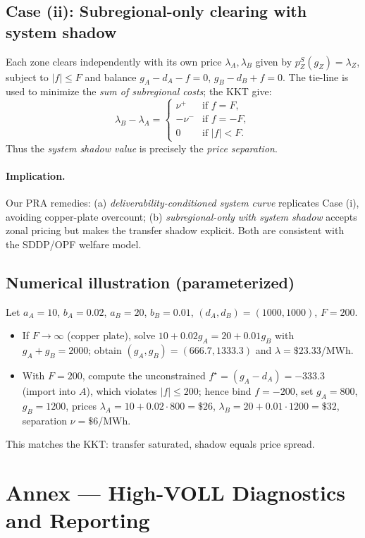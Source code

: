 \documentclass[11pt]{article}
\numberwithin{equation}{section}
\theoremstyle{definition}
\theoremstyle{remark}
\begin{document}
\subsection{ Case (ii): Subregional-only clearing with system shadow}
Each zone clears independently with its own price $\lambda_A,\lambda_B$ given by $p^S_Z(g_Z)=\lambda_Z$, subject to $|f|\le F$ and balance $g_A-d_A-f=0$, $g_B-d_B+f=0$. The tie-line is used to minimize the \emph{sum of subregional costs}; the KKT give:
\[
\lambda_B - \lambda_A = 
\begin{cases}
\nu^{+} & \text{if } f=F,\\
-\nu^{-} & \text{if } f=-F,\\
0 & \text{if } |f|<F.
\end{cases}
\]
Thus the \emph{system shadow value} is precisely the \emph{price separation}. 

\paragraph{Implication.}
Our PRA remedies: (a) \emph{deliverability-conditioned system curve} replicates Case (i), avoiding copper-plate overcount; (b) \emph{subregional-only with system shadow} accepts zonal pricing but makes the transfer shadow explicit. Both are consistent with the SDDP/OPF welfare model.

\subsection{ Numerical illustration (parameterized)}
Let $a_A=10$, $b_A=0.02$, $a_B=20$, $b_B=0.01$, $(d_A,d_B)=(1000,1000)$, $F=200$. 
\begin{itemize}[leftmargin=1.2em]
\item If $F\to\infty$ (copper plate), solve $10+0.02 g_A = 20+0.01 g_B$ with $g_A+g_B=2000$; obtain $(g_A,g_B)=(\num{666.7},\num{1333.3})$ and $\lambda=\$23.33$/MWh.
\item With $F=200$, compute the unconstrained $f^\star=(g_A-d_A)= -333.3$ (import into $A$), which violates $|f|\le 200$; hence bind $f=-200$, set $g_A=800$, $g_B=1200$, prices $\lambda_A=10+0.02\cdot 800=\$26$, $\lambda_B=20+0.01\cdot 1200=\$32$, separation $\nu= \$6$/MWh.
\end{itemize}
This matches the KKT: transfer saturated, shadow equals price spread.

\section{Annex — High-VOLL Diagnostics and Reporting}
\label{annex:M}
\end{document}
